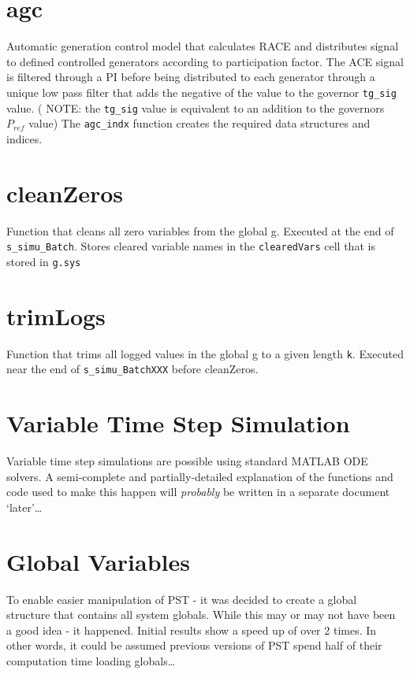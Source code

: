 \section{agc}  
Automatic generation control model that calculates RACE and distributes signal to defined controlled generators according to participation factor.
The ACE signal is filtered through a PI before being distributed to each generator through a unique low pass filter that adds the negative of the value to the governor \verb|tg_sig| value.
( NOTE: the \verb|tg_sig| value is equivalent to an addition to the governors $P_{ref}$ value)
The \verb|agc_indx| function creates the required data structures and indices.

\section{cleanZeros}  
Function that cleans all zero variables from the global g.
Executed at the end of \verb|s_simu_Batch|.
Stores cleared variable names in the \verb|clearedVars| cell that is stored in \verb|g.sys|

\section{trimLogs}  
Function that trims all logged values in the global g to a given length \verb|k|.
Executed near the end of \verb|s_simu_BatchXXX| before cleanZeros.

\section{Variable Time Step Simulation}  
Variable time step simulations are possible using standard MATLAB ODE solvers.
A semi-complete and partially-detailed explanation of the functions and code used to make this happen will \emph{probably} be written in a separate document `later'\ldots


\pagebreak
\section{Global Variables}  
To enable easier manipulation of PST - it was decided to create a global structure that contains all system globals.
While this may or may not have been a good idea - it happened.
Initial results show a speed up of over 2 times.
In other words, it could be assumed previous versions of PST spend half of their computation time loading globals\ldots



